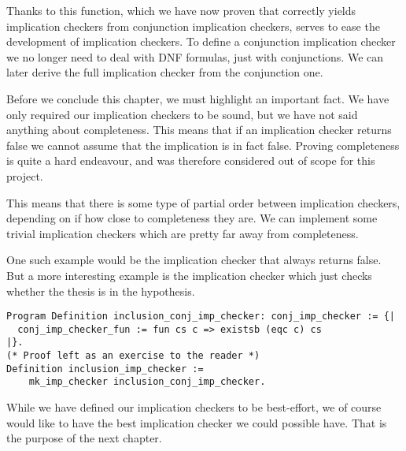 Thanks to this function, which we have now proven that correctly yields
implication checkers from conjunction implication checkers, serves to ease the 
development of implication checkers. To define a conjunction implication checker
we no longer need to deal with DNF formulas, just with conjunctions. We can later
derive the full implication checker from the conjunction one.

Before we conclude this chapter, we must highlight an important fact. We have only
required our implication checkers to be sound, but we have not said anything about
completeness. This means that if an implication checker returns false we cannot 
assume that the implication is in fact false. Proving completeness is quite a hard
endeavour, and was therefore considered out of scope for this project.

This means that there is some type of partial order between implication checkers, 
depending on if how close to completeness they are. We can implement some trivial
implication checkers which are pretty far away from completeness. 

One such example would be the implication checker that always returns false. But a
more interesting example is the implication checker which just checks whether the
thesis is in the hypothesis.

\begin{verbatim}
Program Definition inclusion_conj_imp_checker: conj_imp_checker := {| 
  conj_imp_checker_fun := fun cs c => existsb (eqc c) cs
|}.
(* Proof left as an exercise to the reader *)
Definition inclusion_imp_checker := 
    mk_imp_checker inclusion_conj_imp_checker.
\end{verbatim}

While we have defined our implication checkers to be best-effort, we of course would
like to have the best implication checker we could possible have. That is the 
purpose of the next chapter.